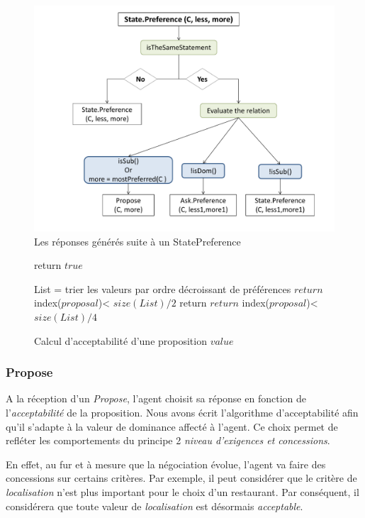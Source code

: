 	\begin{figure}[!t]
		\centering
		\includegraphics[width=4.5in] {Figures/chap4/statePref.pdf}
		\caption{Les réponses générés suite à un StatePreference}
		\label{fig:SP}
	\end{figure}
%	
	
	\begin{figure}[]
		\caption{\label{alg:pseudo} Calcul d'acceptabilité d'une proposition $value$}
		\begin{algorithmic}[1]
			\State return $true$
			\EndIf
			
			\State List = trier les valeurs par ordre décroissant de préférences
			\State $return$ index($proposal$)< $size(List)/2$
			\EndIf
			\State return $return$ index($proposal$)< $size(List)/4$
			\EndIf
			\EndFunction
		\end{algorithmic}
	\end{figure}
	
	
	 
	\subsubsection{Propose}
	A la réception d'un \emph{Propose}, l'agent choisit sa réponse en fonction de l'\emph{acceptabilité} de la proposition.
	Nous avons écrit l'algorithme d'acceptabilité afin qu'il s'adapte à la valeur de dominance affecté à l'agent. Ce choix permet de refléter les comportements du principe 2 \emph{niveau d'exigences et concessions}.
	
	En effet, au fur et à mesure que la négociation évolue, l'agent va faire des concessions sur certains critères. Par exemple, il peut considérer que le critère de \emph{localisation} n'est plus important pour le choix d'un restaurant. Par conséquent, il considérera que toute valeur de \emph{localisation} est désormais \emph{acceptable}.
	
